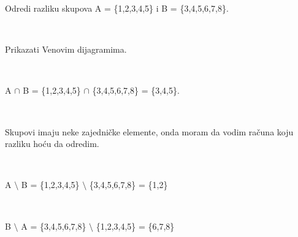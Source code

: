 \begin{zad}

    Odredi razliku skupova A = \{1,2,3,4,5\} i B = \{3,4,5,6,7,8\}. 

    \ 

    Prikazati Venovim dijagramima. 

    \ 



     A $\cap$ B = \{1,2,3,4,5\} $\cap$ \{3,4,5,6,7,8\} = \{3,4,5\}.

     \ 



     \begin{figure}[h] 

        \center


        \caption{}

\end{figure}



    Skupovi imaju neke zajedni\v cke elemente, onda moram da vodim ra\v cuna koju razliku ho\' cu da odredim.

    \ 



    A $\setminus$ B = \{1,2,3,4,5\} $\setminus$ \{3,4,5,6,7,8\} = \{1,2\} 

    \ 

    

    B $\setminus$ A = \{3,4,5,6,7,8\} $\setminus$ \{1,2,3,4,5\} = \{6,7,8\}

    \ 

\end{zad}

